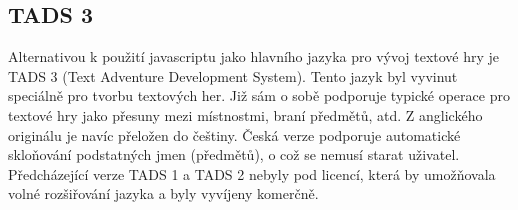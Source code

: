 \documentclass[main.tex]{subfiles}
\begin{document}
\subsection{TADS 3}
\label{tads}
Alternativou k použití javascriptu jako hlavního jazyka pro vývoj textové hry je TADS 3 (Text Adventure Development System). Tento jazyk byl vyvinut speciálně pro tvorbu textových her. Již sám o sobě podporuje typické operace pro textové hry jako přesuny mezi místnostmi, braní předmětů, atd. Z anglického originálu je navíc přeložen do češtiny. Česká verze podporuje automatické skloňování podstatných jmen (předmětů), o což se nemusí starat uživatel. Předcházející verze TADS 1 a TADS 2 nebyly pod licencí, která by umožňovala volné rozšiřování jazyka a byly vyvíjeny komerčně. \cite{web:wik:en:tads, web:tads}
\end{document}
